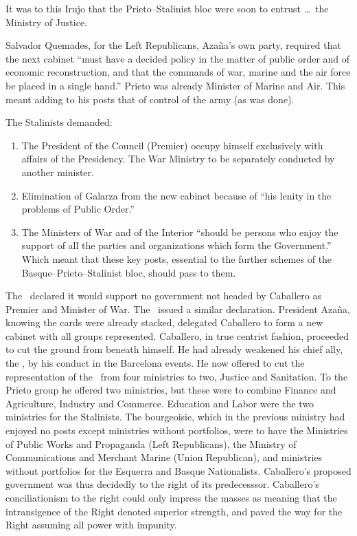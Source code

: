 It was to this Irujo that the Prieto--Stalinist bloc were soon to entrust \dots\ the Ministry of Justice.

Salvador Quemades, for the Left Republicans, Azaña’s own party, required that the next cabinet ``must have a decided policy in the matter of public order and of economic reconstruction, and that the commands of war, marine and the air force be placed in a single hand.\kn\kn'' Prieto was already Minister of Marine and Air. This meant adding to his posts that of control of the army (as was done).

\medskip

The Stalinists demanded:

\begin{enumerate}
	\item The President of the Council (Premier) occupy himself exclusively with affairs of the Presidency. The War Ministry to be separately conducted by another minister.
	
	\item Elimination of Galarza from the new cabinet because of ``his lenity in the problems of Public Order.\kn''
	
	\item The Ministers of War and of the Interior ``should be persons who enjoy the support of all the parties and organizations which form the Government.'' Which meant that these key posts, essential to the further schemes of the Basque--Prieto--Stalinist bloc, should pass to them.
\end{enumerate}

The \CNT\ declared it would support no government not headed by Caballero as Premier and Minister of War. The \UGT\ issued a similar declaration. President Azaña, knowing the cards were already stacked, delegated Caballero to form a new cabinet with all groups represented. Caballero, in true centrist fashion, proceeded to cut the ground from beneath himself. He had already weakened his chief ally, the \CNT\kn, by his conduct in the Barcelona events. He now offered to cut the representation of the \CNT\ from four ministries to two, Justice and Sanitation. To the Prieto group he offered two ministries, but these were to combine Finance and Agriculture, Industry and Commerce. Education and Labor were the two ministries for the Stalinists. The bourgeoisie, which in the previous ministry had enjoyed no posts except ministries without portfolios, were to have the Ministries of Public Works and Propaganda (Left Republicans), the Ministry of Communications and Merchant Marine (Union Republican), and ministries without portfolios for the Esquerra and Basque Nationalists. Caballero’s proposed government was thus decidedly to the right of its predecesssor. Caballero’s conciliationism to the right could only impress the masses as meaning that the intransigence of the Right denoted superior strength, and paved the way for the Right assuming all power with impunity.

